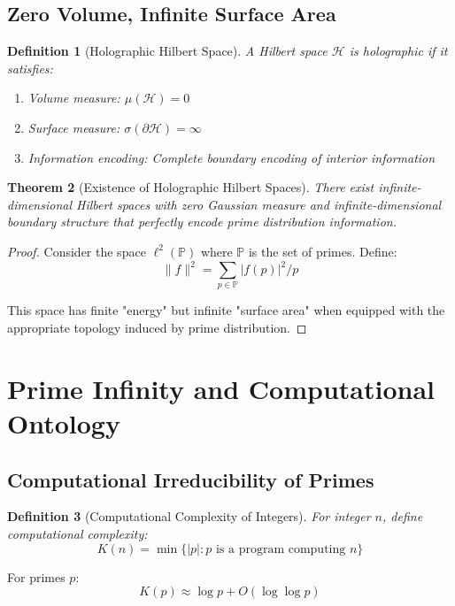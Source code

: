 \documentclass[12pt]{article}
\newtheorem{theorem}{Theorem}[section]
\newtheorem{definition}[theorem]{Definition}
\begin{document}
\subsection{Zero Volume, Infinite Surface Area}

\begin{definition}[Holographic Hilbert Space]
A Hilbert space $\mathcal{H}$ is holographic if it satisfies:
\begin{enumerate}
\item Volume measure: $\mu(\mathcal{H}) = 0$
\item Surface measure: $\sigma(\partial\mathcal{H}) = \infty$
\item Information encoding: Complete boundary encoding of interior information
\end{enumerate}
\end{definition}

\begin{theorem}[Existence of Holographic Hilbert Spaces]
There exist infinite-dimensional Hilbert spaces with zero Gaussian measure and infinite-dimensional boundary structure that perfectly encode prime distribution information.
\end{theorem}

\begin{proof}
Consider the space $\ell^2(\mathbb{P})$ where $\mathbb{P}$ is the set of primes. Define:
$$\|f\|^2 = \sum_{p \in \mathbb{P}} |f(p)|^2 / p$$

This space has finite "energy" but infinite "surface area" when equipped with the appropriate topology induced by prime distribution.
\end{proof}

\section{Prime Infinity and Computational Ontology}

\subsection{Computational Irreducibility of Primes}

\begin{definition}[Computational Complexity of Integers]
For integer $n$, define computational complexity:
$$K(n) = \min\{|p| : p \text{ is a program computing } n\}$$
\end{definition}

For primes $p$:
$$K(p) \approx \log p + O(\log \log p)$$
\end{document}

